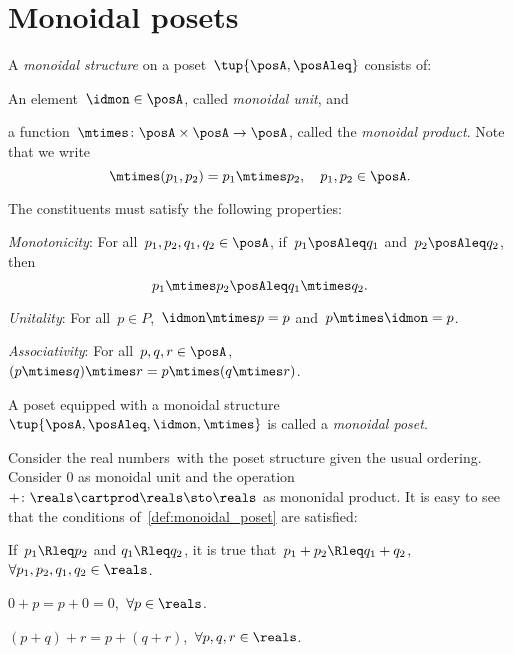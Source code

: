 

\section{Monoidal posets}\label{sec:parallelism-monoidal-posets}

\begin{definition}
  A \emph{monoidal structure} on a poset~$\tup{\posA,\posAleq}$ consists of:
  \begin{compactenum}
    \item An element~$\idmon\in \posA$, called \emph{monoidal unit}, and
    \item a function~$\mtimes\colon \posA\times \posA\to \posA$, called the \emph{monoidal product}. Note that we write
    \begin{equation*}
      \mtimes(p_1,p_2)=p_1\mtimes p_2, \quad p_1,p_2\in \posA.
    \end{equation*}
  \end{compactenum}
  The constituents must satisfy the following properties:
  \begin{compactenum}[(a)]
    \item \emph{Monotonicity}: For all~$p_1,p_2,q_1,q_2\in \posA$, if~$p_1\posAleq q_1$ and~$p_2\posAleq q_2$, then
    \begin{equation*}
      p_1\mtimes p_2\posAleq q_1\mtimes q_2.
    \end{equation*}
    \item \emph{Unitality}: For all~$p\in P$,~$\idmon\mtimes p=p$ and~$p\mtimes \idmon=p$.
    \item \emph{Associativity}: For all~$p,q,r\in \posA $, $(p\mtimes q)\mtimes r=p\mtimes (q\mtimes r)$.
  \end{compactenum}
  A poset equipped with a monoidal structure $\tup{\posA,\posAleq,\idmon,\mtimes}$ is called a \emph{monoidal poset}.
\end{definition}

\begin{example}
  \label{ex:monoidal_pos_reals}
  Consider the real numbers~\reals with the poset structure given the usual ordering. Consider 0 as monoidal unit and the operation~$+\colon \reals\cartprod \reals\sto \reals$ as mononidal product. It is easy to see that the conditions of~\cref{def:monoidal_poset} are satisfied:
  \begin{compactenum}[(a)]
    \item If~$p_1\Rleq  p_2$ and $q_1\Rleq  q_2$, it is true that~$p_1+p_2\Rleq  q_1+q_2$,~$\forall p_1,p_2,q_1,q_2\in \reals$.
    \item $0+p=p+0=0$,~$\forall p\in \reals$.
    \item $(p+q)+r=p+(q+r)$,~$\forall p,q,r\in \reals$.
  \end{compactenum}
\end{example}

